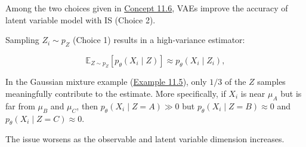 \documentclass{report}
\begin{document}
\begin{concept}
    Among the two choices given in \hyperref[concept:11.6]{Concept 11.6}, VAEs improve the accuracy of latent variable model with IS (Choice 2).

    Sampling $Z_{i} \sim p_{Z}$ (Choice 1) results in a high-variance estimator:

    $$
    \mathbb{E}_{Z \sim p_{Z}}\left[p_{\theta}\left(X_{i} \mid Z\right)\right] \approx p_{\theta}\left(X_{i} \mid Z_{i}\right),
    $$

    In the Gaussian mixture example (\hyperref[example:11.5]{Example 11.5}), only $1 / 3$ of the $Z$ samples meaningfully contribute to the estimate. More specifically, if $X_{i}$ is near $\mu_{A}$ but is far from $\mu_{B}$ and $\mu_{C}$, then $p_{\theta}\left(X_{i} \mid Z=A\right) \gg 0$ but $p_{\theta}\left(X_{i} \mid Z=B\right) \approx 0$ and $p_{\theta}\left(X_{i} \mid Z=C\right) \approx 0$.

    The issue worsens as the observable and latent variable dimension increases.
\end{concept}

\par\noindent\textcolor{gray}{\hdashrule{\textwidth}{0.4pt}{1pt 2pt}}
\end{document}
